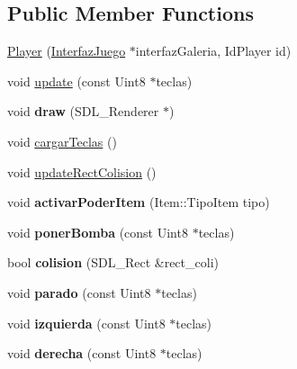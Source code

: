 \subsection*{Public Member Functions}
\begin{DoxyCompactItemize}
\item 
\hyperlink{class_player_a3c4941d61e2f967ddb6ab2624cd1f1b3}{Player} (\hyperlink{class_interfaz_juego}{Interfaz\+Juego} $\ast$interfaz\+Galeria, Id\+Player id)
\item 
void \hyperlink{class_player_a5cb527f12c3423e1bbb1b6595a85acfc}{update} (const Uint8 $\ast$teclas)
\item 
void {\bfseries draw} (S\+D\+L\+\_\+\+Renderer $\ast$)\hypertarget{class_player_a69c5d0b03b75874507ad7eeed7ef4703}{}\label{class_player_a69c5d0b03b75874507ad7eeed7ef4703}

\item 
void \hyperlink{class_player_a0caf6c06d8076056c2537f493ee3794f}{cargar\+Teclas} ()
\item 
void \hyperlink{class_player_a4537081baf81b12cc98c98c904e15909}{update\+Rect\+Colision} ()
\item 
void {\bfseries activar\+Poder\+Item} (Item\+::\+Tipo\+Item tipo)\hypertarget{class_player_a07afc2e2bfd131ceddd53c24be1fc3ec}{}\label{class_player_a07afc2e2bfd131ceddd53c24be1fc3ec}

\item 
void {\bfseries poner\+Bomba} (const Uint8 $\ast$teclas)\hypertarget{class_player_aae11ba7baef6858a3294fd86d3eac1ed}{}\label{class_player_aae11ba7baef6858a3294fd86d3eac1ed}

\item 
bool {\bfseries colision} (S\+D\+L\+\_\+\+Rect \&rect\+\_\+coli)\hypertarget{class_player_aeee9778dafe9d93c8273dcf1abc0d7b5}{}\label{class_player_aeee9778dafe9d93c8273dcf1abc0d7b5}

\item 
void {\bfseries parado} (const Uint8 $\ast$teclas)\hypertarget{class_player_ae1ee2ab40c56cb42f13224291a0f0ab7}{}\label{class_player_ae1ee2ab40c56cb42f13224291a0f0ab7}

\item 
void {\bfseries izquierda} (const Uint8 $\ast$teclas)\hypertarget{class_player_a82ff3440c08bd0c116b53b90c29efa92}{}\label{class_player_a82ff3440c08bd0c116b53b90c29efa92}

\item 
void {\bfseries derecha} (const Uint8 $\ast$teclas)\hypertarget{class_player_a0345065f26494d5312365b406b5c0acd}{}\label{class_player_a0345065f26494d5312365b406b5c0acd}


\end{DoxyCompactItemize}
